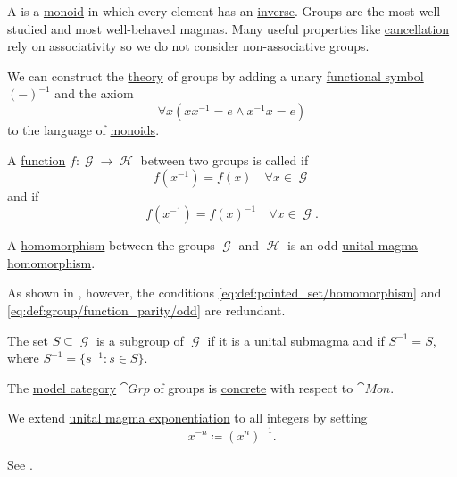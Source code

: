 \begin{definition}\label{def:group}
  A  is a \hyperref[def:unital_magma/associative]{monoid} in which every element has an \hyperref[def:unital_magma_inverse_element]{inverse}. Groups are the most well-studied and most well-behaved magmas. Many useful properties like \hyperref[thm:group_properties/cancellative]{cancellation} rely on associativity so we do not consider non-associative groups.

  \begin{thmenum}
     We can construct the \hyperref[def:first_order_theory]{theory} of groups by adding a unary \hyperref[def:first_order_language/func]{functional symbol} \( (-)^{-1} \) and the axiom
    \begin{equation}\label{eq:def:group/theory/inverse_axiom}
      \forall x (xx^{-1} = e \wedge x^{-1}x = e)
    \end{equation}
    to the language of \hyperref[def:unital_magma/associative]{monoids}.

     A \hyperref[def:function/single_valued]{function} \( f: \mscrG \to \mscrH \) between two groups is called  if
    \begin{equation}\label{eq:def:group/function_parity/even}
      f(x^{-1}) = f(x) \quad\forall x \in \mscrG
    \end{equation}
    and  if
    \begin{equation}\label{eq:def:group/function_parity/odd}
      f(x^{-1}) = f(x)^{-1} \quad\forall x \in \mscrG.
    \end{equation}

     A \hyperref[def:first_order_homomorphism]{homomorphism} between the groups \( \mscrG \) and \( \mscrH \) is an odd \hyperref[def:unital_magma/homomorphism]{unital magma homomorphism}.

    As shown in , however, the conditions \eqref{eq:def:pointed_set/homomorphism} and \eqref{eq:def:group/function_parity/odd} are redundant.

     The set \( S \subseteq \mscrG \) is a \hyperref[def:first_order_substructure]{subgroup} of \( \mscrG \) if it is a \hyperref[def:unital_magma/substructure]{unital submagma} and if \( S^{-1} = S \), where \( S^{-1} = \{ s^{-1} \colon s \in S \} \).

     The \hyperref[def:first_order_model_category]{model category} \( \cat{Grp} \) of groups is \hyperref[def:concrete_category]{concrete} with respect to \hyperref[def:unital_magma/associative]{\( \cat{Mon} \)}.

     We extend \hyperref[def:unital_magma/exponentiation]{unital magma exponentiation} to all integers by setting
    \begin{equation*}
      x^{-n} \coloneqq (x^n)^{-1}.
    \end{equation*}

    See .
  \end{thmenum}
\end{definition}


